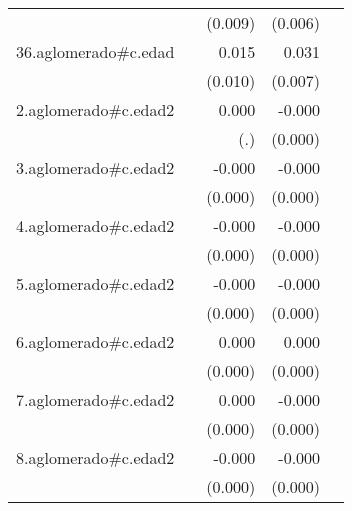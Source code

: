 {\begin{longtable}{l*{4}{D{.}{.}{-1}}}
            &                     &     (0.009)         &     (0.006)         &                     \\
\addlinespace
36.aglomerado#c.edad&                     &       0.015         &       0.031\sym{***}&                     \\
            &                     &     (0.010)         &     (0.007)         &                     \\
\addlinespace
2.aglomerado#c.edad2&                     &       0.000         &      -0.000\sym{*}  &                     \\
            &                     &         (.)         &     (0.000)         &                     \\
\addlinespace
3.aglomerado#c.edad2&                     &      -0.000         &      -0.000\sym{***}&                     \\
            &                     &     (0.000)         &     (0.000)         &                     \\
\addlinespace
4.aglomerado#c.edad2&                     &      -0.000         &      -0.000\sym{**} &                     \\
            &                     &     (0.000)         &     (0.000)         &                     \\
\addlinespace
5.aglomerado#c.edad2&                     &      -0.000         &      -0.000\sym{*}  &                     \\
            &                     &     (0.000)         &     (0.000)         &                     \\
\addlinespace
6.aglomerado#c.edad2&                     &       0.000         &       0.000         &                     \\
            &                     &     (0.000)         &     (0.000)         &                     \\
\addlinespace
7.aglomerado#c.edad2&                     &       0.000         &      -0.000         &                     \\
            &                     &     (0.000)         &     (0.000)         &                     \\
\addlinespace
8.aglomerado#c.edad2&                     &      -0.000         &      -0.000\sym{**} &                     \\
            &                     &     (0.000)         &     (0.000)         &                     \\

\end{longtable}}
